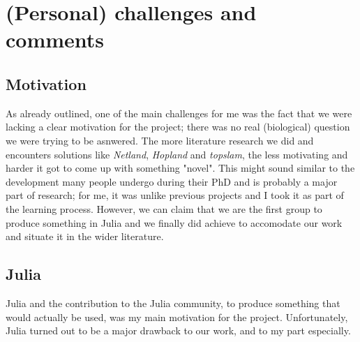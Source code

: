 \documentclass[journal, a4paper]{IEEEtran}
\begin{document}
\section{(Personal) challenges and comments}\label{personalchallenges}


\subsection{Motivation}
As already outlined, one of the main challenges for me was the fact that we were lacking a clear motivation for the project; there was no real (biological) question we were trying to be asnwered. The more literature research we did and encounters solutions like \textit{Netland}, \textit{Hopland} and \textit{topslam}, the less motivating and harder it got to come up with something "novel". This might sound similar to the development many people undergo during their PhD and is probably a major part of research; for me, it was unlike previous projects and I took it as part of the learning process.
However, we can claim that we are the first group to produce something in Julia and we finally did achieve to accomodate our work and situate it in the wider literature. 

\subsection{Julia}\label{julia}
Julia and the contribution to the Julia community, to produce something that would actually be used, was my main motivation for the project. Unfortunately, Julia turned out to be a major drawback to our work, and to my part especially.

\end{document}
